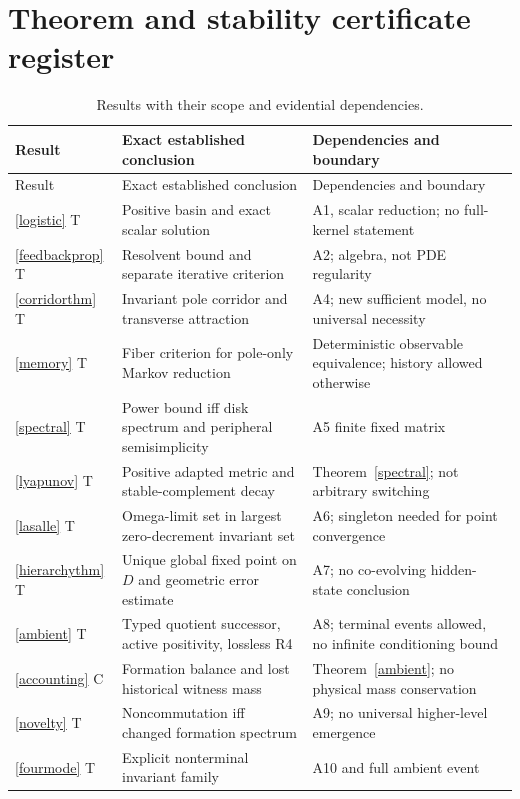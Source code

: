 \documentclass[11pt,letterpaper]{article}
\theoremstyle{definition}
\numberwithin{equation}{section}
\begin{document}
\section{Theorem and stability certificate register}
\begin{longtable}{p{}p{}p{}}
\caption{Results with their scope and evidential dependencies.}\label{tab:theorems}\\
\toprule Result & Exact established conclusion & Dependencies and boundary\\\midrule\endfirsthead
\toprule Result & Exact established conclusion & Dependencies and boundary\\\midrule\endhead
\ref{logistic} T & Positive basin and exact scalar solution & A1, scalar reduction; no full-kernel statement\\
\ref{feedbackprop} T & Resolvent bound and separate iterative criterion & A2; algebra, not PDE regularity\\
\ref{corridorthm} T & Invariant pole corridor and transverse attraction & A4; new sufficient model, no universal necessity\\
\ref{memory} T & Fiber criterion for pole-only Markov reduction & Deterministic observable equivalence; history allowed otherwise\\
\ref{spectral} T & Power bound iff disk spectrum and peripheral semisimplicity & A5 finite fixed matrix\\
\ref{lyapunov} T & Positive adapted metric and stable-complement decay & Theorem~\ref{spectral}; not arbitrary switching\\
\ref{lasalle} T & Omega-limit set in largest zero-decrement invariant set & A6; singleton needed for point convergence\\
\ref{hierarchythm} T & Unique global fixed point on $D$ and geometric error estimate & A7; no co-evolving hidden-state conclusion\\
\ref{ambient} T & Typed quotient successor, active positivity, lossless R4 & A8; terminal events allowed, no infinite conditioning bound\\
\ref{accounting} C & Formation balance and lost historical witness mass & Theorem~\ref{ambient}; no physical mass conservation\\
\ref{novelty} T & Noncommutation iff changed formation spectrum & A9; no universal higher-level emergence\\
\ref{fourmode} T & Explicit nonterminal invariant family & A10 and full ambient event\\

\end{longtable}
\end{document}
